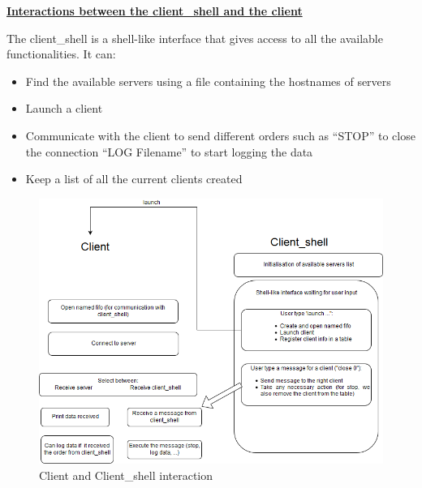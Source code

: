 \hfill \break \underline{\large{\textbf{Interactions between the client\_shell and the client}}}

The client\_shell is a shell-like interface that gives access to all the available functionalities.
It can:
\begin{itemize}
	\item Find the available servers using a file containing the hostnames of servers
	\item Launch a client
	\item Communicate with the client to send different orders such as
		\subitem "`STOP"' to close the connection
		\subitem "`LOG Filename"' to start logging the data
  \item Keep a list of all the current clients created
	\end{itemize}




\begin{figure}[H]
\begin{center}
\includegraphics[width=\textwidth]{image/clientshellClient.png}%
\caption{Client and Client\_shell interaction}%
\label{figure:CSC}%
\end{center}
\end{figure}




